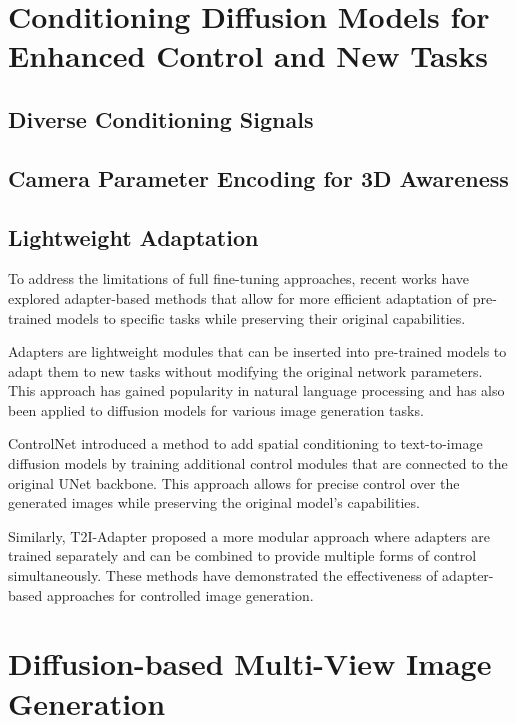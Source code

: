 \section{Conditioning Diffusion Models for Enhanced Control and New
Tasks}\label{sec:conditioning-diffusion}

\subsection{Diverse Conditioning Signals}

\subsection{Camera Parameter Encoding for 3D Awareness}

\subsection{Lightweight Adaptation}

To address the limitations of full fine-tuning approaches, recent
works have explored adapter-based methods that allow for more
efficient adaptation of pre-trained models to specific tasks while
preserving their original capabilities.

Adapters are lightweight modules that can be inserted into
pre-trained models to adapt them to new tasks without modifying the
original network parameters. This approach has gained popularity in
natural language processing and has also been applied to diffusion
models for various image generation tasks.

ControlNet \cite{controlnet} introduced a method to add spatial
conditioning to text-to-image diffusion models by training additional
control modules that are connected to the original UNet backbone.
This approach allows for precise control over the generated images
while preserving the original model's capabilities.

Similarly, T2I-Adapter \cite{t2iadapter} proposed a more modular
approach where adapters are trained separately and can be combined to
provide multiple forms of control simultaneously. These methods have
demonstrated the effectiveness of adapter-based approaches for
controlled image generation.

\section{Diffusion-based Multi-View Image
Generation}\label{sec:multi-view-diffusion}

